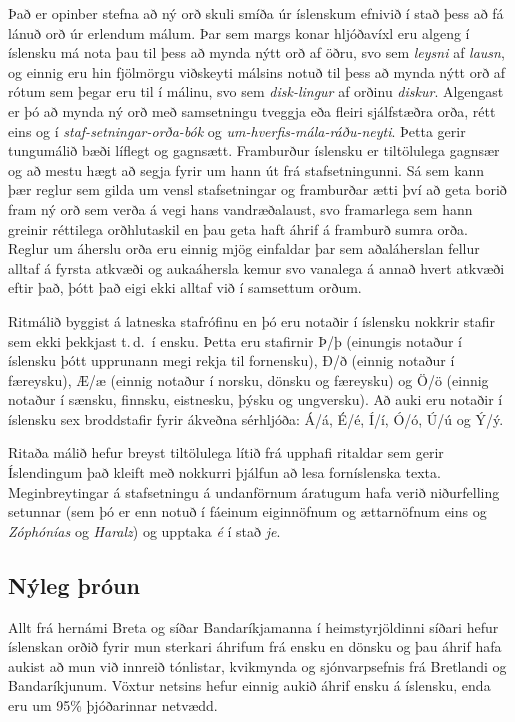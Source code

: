 \begin{multicols}{2}
Það er opinber stefna að ný orð skuli smíða úr íslenskum efnivið í stað þess að fá lánuð orð úr erlendum málum. Þar sem margs konar hljóðavíxl eru algeng í íslensku má nota þau til þess að mynda nýtt orð af öðru, svo sem \textit{leysni} af \textit{lausn}, og einnig eru hin fjölmörgu viðskeyti málsins notuð til þess að mynda nýtt orð af rótum sem þegar eru til í málinu, svo sem \textit{disk-lingur} af orðinu \textit{diskur}. Algengast er þó að mynda ný orð með samsetningu tveggja eða fleiri sjálfstæðra orða, rétt eins og í \textit{staf-setningar-orða-bók} og \textit{um-hverfis-mála-ráðu-neyti}. Þetta gerir tungumálið bæði líflegt og gagnsætt.
Framburður íslensku er tiltölulega gagnsær og að mestu hægt að segja fyrir um hann út frá stafsetningunni. Sá sem kann þær reglur sem gilda um vensl stafsetningar og framburðar ætti því að geta borið fram ný orð sem verða á vegi hans vandræðalaust, svo framarlega sem hann greinir réttilega orðhlutaskil en þau geta haft áhrif á framburð sumra orða. Reglur um áherslu orða eru einnig mjög einfaldar þar sem aðaláherslan fellur alltaf á fyrsta atkvæði og aukaáhersla kemur svo vanalega á annað hvert atkvæði eftir það, þótt það eigi ekki alltaf við í samsettum orðum.

Ritmálið byggist á latneska stafrófinu en þó eru notaðir í íslensku nokkrir stafir sem ekki þekkjast t.\,d.~í ensku. Þetta eru stafirnir Þ/þ (einungis notaður í íslensku þótt upprunann megi rekja til fornensku), Ð/ð (einnig notaður í færeysku), Æ/æ (einnig notaður í norsku, dönsku og færeysku) og Ö/ö (einnig notaður í sænsku, finnsku, eistnesku, þýsku og ungversku). Að auki eru notaðir í íslensku sex broddstafir fyrir ákveðna sérhljóða: Á/á, É/é, Í/í, Ó/ó, Ú/ú og Ý/ý.

Ritaða málið hefur breyst tiltölulega lítið frá upphafi ritaldar sem gerir Íslendingum það kleift með nokkurri þjálfun að lesa forníslenska texta. Meginbreytingar á stafsetningu á undanförnum áratugum hafa verið niðurfelling setunnar (sem þó er enn notuð í fáeinum eiginnöfnum og ættarnöfnum eins og \textit{Zóphónías} og \textit{Haralz}) og upptaka \textit{é} í stað \textit{je}.

\subsection{Nýleg þróun}

Allt frá hernámi Breta og síðar Bandaríkjamanna í heimstyrjöldinni síðari hefur íslenskan orðið fyrir mun sterkari áhrifum frá ensku en dönsku og þau áhrif hafa aukist að mun við innreið tónlistar, kvikmynda og sjónvarpsefnis frá Bretlandi og Bandaríkjunum. Vöxtur netsins hefur einnig aukið áhrif ensku á íslensku, enda eru um 95\% þjóðarinnar netvædd. 


\end{multicols}
